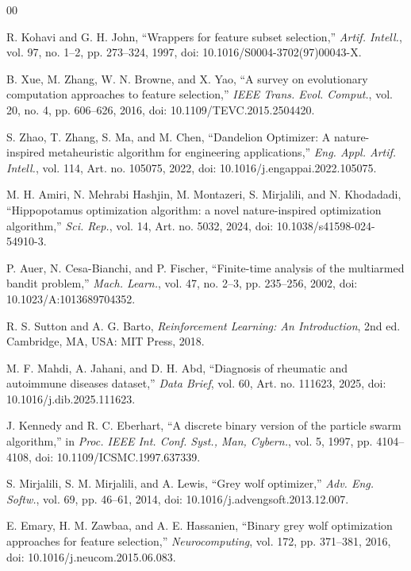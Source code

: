 \begin{thebibliography}{00}

 R. Kohavi and G. H. John, ``Wrappers for feature subset selection,'' \textit{Artif. Intell.}, vol. 97, no. 1--2, pp. 273--324, 1997, doi: 10.1016/S0004-3702(97)00043-X.

 B. Xue, M. Zhang, W. N. Browne, and X. Yao, ``A survey on evolutionary computation approaches to feature selection,'' \textit{IEEE Trans. Evol. Comput.}, vol. 20, no. 4, pp. 606--626, 2016, doi: 10.1109/TEVC.2015.2504420.

 S. Zhao, T. Zhang, S. Ma, and M. Chen, ``Dandelion Optimizer: A nature-inspired metaheuristic algorithm for engineering applications,'' \textit{Eng. Appl. Artif. Intell.}, vol. 114, Art. no. 105075, 2022, doi: 10.1016/j.engappai.2022.105075.

 M. H. Amiri, N. Mehrabi Hashjin, M. Montazeri, S. Mirjalili, and N. Khodadadi, ``Hippopotamus optimization algorithm: a novel nature-inspired optimization algorithm,'' \textit{Sci. Rep.}, vol. 14, Art. no. 5032, 2024, doi: 10.1038/s41598-024-54910-3.

 P. Auer, N. Cesa-Bianchi, and P. Fischer, ``Finite-time analysis of the multiarmed bandit problem,'' \textit{Mach. Learn.}, vol. 47, no. 2--3, pp. 235--256, 2002, doi: 10.1023/A:1013689704352.

 R. S. Sutton and A. G. Barto, \textit{Reinforcement Learning: An Introduction}, 2nd ed. Cambridge, MA, USA: MIT Press, 2018.

 M. F. Mahdi, A. Jahani, and D. H. Abd, ``Diagnosis of rheumatic and autoimmune diseases dataset,'' \textit{Data Brief}, vol. 60, Art. no. 111623, 2025, doi: 10.1016/j.dib.2025.111623.

 J. Kennedy and R. C. Eberhart, ``A discrete binary version of the particle swarm algorithm,'' in \textit{Proc. IEEE Int. Conf. Syst., Man, Cybern.}, vol. 5, 1997, pp. 4104--4108, doi: 10.1109/ICSMC.1997.637339.

 S. Mirjalili, S. M. Mirjalili, and A. Lewis, ``Grey wolf optimizer,'' \textit{Adv. Eng. Softw.}, vol. 69, pp. 46--61, 2014, doi: 10.1016/j.advengsoft.2013.12.007.

 E. Emary, H. M. Zawbaa, and A. E. Hassanien, ``Binary grey wolf optimization approaches for feature selection,'' \textit{Neurocomputing}, vol. 172, pp. 371--381, 2016, doi: 10.1016/j.neucom.2015.06.083.


\end{thebibliography}
